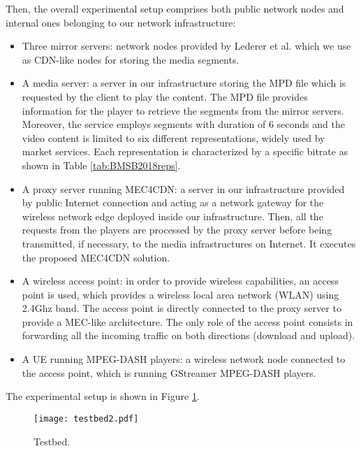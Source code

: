 Then, the overall experimental setup comprises both public network nodes and internal ones belonging to our network infrastructure:
\begin{itemize}
	\item Three mirror servers: network nodes provided by Lederer et al. \cite{lederer2013} which we use as CDN-like nodes for storing the media segments.
	\item A media server: a server in our infrastructure storing the MPD file which is requested by the client to play the content.
	The MPD file provides information for the player to retrieve the segments from the mirror servers. Moreover, the service employs segments with duration of 6 seconds and the video content is limited to six different representations, widely used by market services. Each representation is characterized by a specific bitrate as shown in Table \ref{tab:BMSB2018reps}.
	\item A proxy server running MEC4CDN: a server in our infrastructure provided by public Internet connection and acting as a network gateway for the wireless network edge deployed inside our infrastructure. Then, all the requests from the players are processed by the proxy server before being transmitted, if necessary, to the media infrastructures on Internet. It executes the proposed MEC4CDN solution. 
	\item A wireless access point: in order to provide wireless capabilities, an access point is used, which provides a wireless local area network (WLAN) using 2.4Ghz band. The access point is directly connected to the proxy server to provide a MEC-like architecture. The only role of the access point consists in forwarding all the incoming traffic on both directions (download and upload).
	\item A UE running MPEG-DASH players: a wireless network node connected to the access point, which is running GStreamer MPEG-DASH players.
\end{itemize}
The experimental setup is shown in Figure \ref{fig:BMSB2018testbed}.

\begin{figure}[htp]
	\centering
	\texttt{[image: testbed2.pdf]}
	\caption{Testbed.}
	\label{fig:BMSB2018testbed}
\end{figure}

